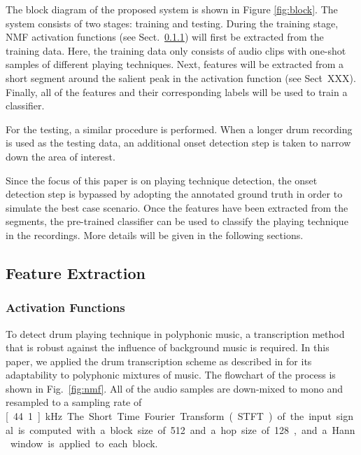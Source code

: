 \documentclass{article}
\begin{document}
{{{{{The block diagram of the proposed system is shown in Figure \ref{fig:block}. The system consists of two stages: training and testing. During the training stage, NMF {\color{red}{already introduced?}} activation functions (see Sect.~\ref{sssec:activ}) will first be extracted from the training data. Here, the training data only consists of audio clips with one-shot samples of different playing techniques. Next, features will be extracted from a short segment around the salient peak in the activation function (see Sect\.~XXX). Finally, all of the features and their corresponding labels will be used to train a classifier. {\color{red}{introduce the classes here} For the testing, a similar procedure is performed. When a longer drum recording is used as the testing data, an additional onset detection step is taken to narrow down the area of interest. {\color{red}{the following sentence maybe later --- not really system overview} Since the focus of this paper is on playing technique detection, the onset detection step is bypassed by adopting the annotated ground truth in order to simulate the best case scenario. Once the features have been extracted from the segments, the pre-trained classifier can be used to classify the playing technique in the recordings. More details will be given in the following sections. 
 
\subsection{Feature Extraction}\label{ssec:featuresExtract}
\subsubsection{Activation Functions}
\label{sssec:activ}

To detect drum playing technique in polyphonic music, a transcription method that is robust against the influence of background music is required. In this paper, we applied the drum transcription scheme as described in \cite{Wu2015a} for its adaptability to polyphonic mixtures of music. The flowchart of the process is shown in Fig.~\ref{fig:nmf}. All of the audio samples are down-mixed to mono and resampled to a sampling rate of \unit[44.1]{kHz}. The Short Time Fourier Transform (STFT) of the input signal is computed with a block size of 512 and a hop size of 128, and a Hann window is applied to each block. 

}}}}}}}
\end{document}
